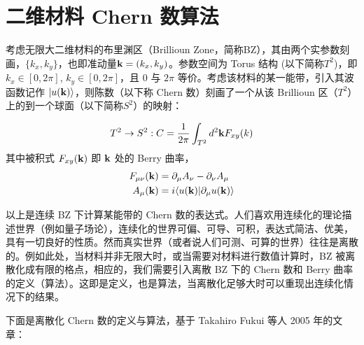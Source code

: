 
\chapter{二维材料 Chern 数算法}

考虑无限大二维材料的布里渊区（Brillioun Zone，简称BZ），其由两个实参数刻画，$\{k_x, k_y\}$，也即准动量$\mathbf{k}=(k_x, k_y)$。参数空间为 Torus 结构 (以下简称$T^2$)，即 $k_x\in[0, 2\pi]$, $k_y\in[0, 2\pi]$，且 0 与 $2\pi$ 等价。考虑该材料的某一能带，引入其波函数记作 $|u(\mathbf{k})\rangle$，则陈数（以下称 Chern 数）刻画了一个从该 Brillioun 区（$T^2$）上的到一个球面（以下简称$S^2$）的映射：

\begin{align}
T^2 \rightarrow S^2 : C = \frac{1}{2\pi}\int_{T^2}d^2\mathbf{k} F_{xy}(k)
\end{align}
其中被积式 $F_{xy}(\mathbf{k})$ 即 $\mathbf{k}$ 处的 Berry 曲率，
\begin{align}
F_{\mu\nu}(\mathbf{k})&=\partial_{\mu}A_{\nu} - \partial_{\nu}A_{\mu} \\ 
A_{\mu}(\mathbf{k})&=i\langle u(\mathbf{k})|\partial_{\mu}u(\mathbf{k})\rangle
\end{align}

以上是连续 BZ 下计算某能带的 Chern 数的表达式。人们喜欢用连续化的理论描述世界（例如量子场论），连续化的世界可偏、可导、可积，表达式简洁、优美，具有一切良好的性质。然而真实世界（或者说人们可测、可算的世界）往往是离散的。例如此处，当材料并非无限大时，或当需要对材料进行数值计算时，BZ 被离散化成有限的格点，相应的，我们需要引入离散 BZ 下的 Chern 数和 Berry 曲率的定义（算法）。这即是定义，也是算法，当离散化足够大时可以重现出连续化情况下的结果。

下面是离散化 Chern 数的定义与算法，基于 Takahiro Fukui 等人 2005 年的文章：

